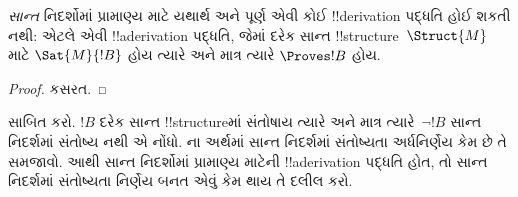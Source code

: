 \documentclass[../../../include/open-logic-section]{subfiles}
\begin{document}
\begin{cor}%
  \emph{સાન્ત} નિદર્શોમાં પ્રામાણ્ય માટે
  યથાર્થ અને પૂર્ણ એવી કોઈ !!{derivation}
  પદ્ધતિ હોઈ શકતી નથી: એટલે એવી !!a{derivation} પદ્ધતિ,
  જેમાં દરેક સાન્ત !!{structure}~$\Struct{M}$
  માટે $\Sat{M}{!B}$ હોય ત્યારે અને માત્ર
  ત્યારે $\Proves !B$ હોય.
\end{cor}

\begin{proof}
  કસરત.
\end{proof}

\begin{prob}
  સાબિત કરો. $!B$ દરેક સાન્ત !!{structure}માં
  સંતોષાય ત્યારે અને માત્ર ત્યારે~$\lnot !B$
  સાન્ત નિદર્શમાં સંતોષ્ય નથી એ નોંધો.
  ના અર્થમાં
  સાન્ત નિદર્શમાં સંતોષ્યતા અર્ધનિર્ણેય કેમ
  છે તે સમજાવો. આથી સાન્ત નિદર્શોમાં
  પ્રામાણ્ય માટેની !!a{derivation} પદ્ધતિ હોત,
  તો સાન્ત નિદર્શમાં સંતોષ્યતા નિર્ણેય બનત
  એવું કેમ થાય તે દલીલ કરો.
\end{prob}
\end{document}
